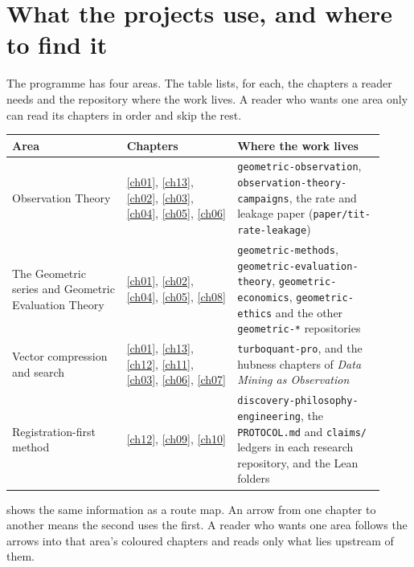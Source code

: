 \section*{What the projects use, and where to find it}

The programme has four areas. The table lists, for each, the chapters a reader needs and the repository where the work lives. A reader who wants one area only can read its chapters in order and skip the rest.

\begin{center}
\small
\begin{tabular}{@{}p{0.29\linewidth}p{0.27\linewidth}p{0.36\linewidth}@{}}
\toprule
Area & Chapters & Where the work lives \\
\midrule
Observation Theory & \ref{ch01}, \ref{ch13}, \ref{ch02}, \ref{ch03}, \ref{ch04}, \ref{ch05}, \ref{ch06} & \texttt{geometric-observation}, \texttt{observation-theory-campaigns}, the rate and leakage paper (\texttt{paper/tit-rate-leakage}) \\
The Geometric series and Geometric Evaluation Theory & \ref{ch01}, \ref{ch02}, \ref{ch04}, \ref{ch05}, \ref{ch08} & \texttt{geometric-methods}, \texttt{geometric-evaluation-theory}, \texttt{geometric-economics}, \texttt{geometric-ethics} and the other \texttt{geometric-*} repositories \\
Vector compression and search & \ref{ch01}, \ref{ch13}, \ref{ch12}, \ref{ch11}, \ref{ch03}, \ref{ch06}, \ref{ch07} & \texttt{turboquant-pro}, and the hubness chapters of \emph{Data Mining as Observation} \\
Registration-first method & \ref{ch12}, \ref{ch09}, \ref{ch10} & \texttt{discovery-philosophy-engineering}, the \texttt{PROTOCOL.md} and \texttt{claims/} ledgers in each research repository, and the Lean folders \\
\bottomrule
\end{tabular}
\end{center}

 shows the same information as a route map. An arrow from one chapter to another means the second uses the first. A reader who wants one area follows the arrows into that area's coloured chapters and reads only what lies upstream of them.

